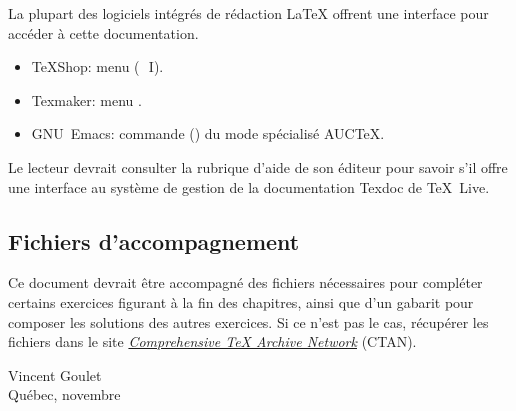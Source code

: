 La plupart des logiciels intégrés de rédaction {\LaTeX} offrent une
interface pour accéder à cette documentation.
\begin{itemize}
\item TeXShop: menu  (\optkey\,\cmdkey\, I).
\item Texmaker: menu .
\item GNU~Emacs: commande  () du mode
  spécialisé AUC{\TeX}.
\end{itemize}
Le lecteur devrait consulter la rubrique d'aide de son éditeur pour
savoir s'il offre une interface au système de gestion de la
documentation Texdoc de {\TeX}~Live.

\subsection*{Fichiers d'accompagnement}

Ce document devrait être accompagné des fichiers nécessaires pour
compléter certains exercices figurant à la fin des chapitres, ainsi
que d'un gabarit  pour composer les
solutions des autres exercices. Si ce n'est pas le cas, récupérer les
fichiers dans le site \href{\ctanurl}{\emph{Comprehensive TeX Archive
    Network}} (CTAN).

\begin{flushright}
  Vincent Goulet \\
  Québec, novembre \year
\end{flushright}

